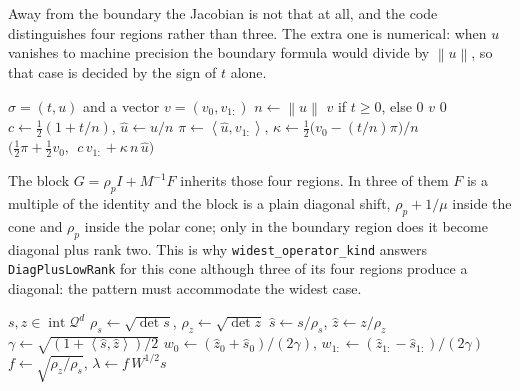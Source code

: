 \documentclass[a4paper,11pt]{book}
\theoremstyle{plain}
\theoremstyle{definition}
\theoremstyle{remark}
\numberwithin{equation}{chapter}
\numberwithin{algorithm}{chapter}
\newcommand{\proj}[2]{\Pi_{#2}\!\left(#1\right)}
\newcommand{\norm}[1]{\left\|#1\right\|}
\newcommand{\inner}[2]{\left\langle #1, #2 \right\rangle}
\newcommand{\intr}{\operatorname{int}}
\begin{document}
	Away from the boundary the Jacobian is not that at all, and the code
	distinguishes four regions rather than three. The extra one is numerical: when
	$u$ vanishes to machine precision the boundary formula would divide by
	$\norm{u}$, so that case is decided by the sign of $t$ alone.

	\begin{algorithm}[H]
		\caption{Applying $F\in\partial\proj{\cdot}{\mathcal{Q}^d}(\sigma)$}
		\begin{algorithmic}[1]
			\Require $\sigma=(t,u)$ and a vector $v=(v_0,v_{1:})$
			\State $n\gets\norm{u}$
			\State \Return $v$ if $t\geq0$, else $0$
			 \State \Return $v$ 
			 \State \Return $0$ 
			\Else
			\State $c\gets\tfrac12(1+t/n)$, \quad $\widehat u\gets u/n$
			\State $\pi\gets\inner{\widehat u}{v_{1:}}$, \quad
			$\kappa\gets\tfrac12\bigl(v_0-(t/n)\pi\bigr)/n$
			\State \Return
			$\bigl(\tfrac12\pi+\tfrac12v_0,\ \ c\,v_{1:}+\kappa\,n\,\widehat
			u\bigr)$
			\EndIf
		\end{algorithmic}
	\end{algorithm}

	The block $G=\rho_pI+M^{-1}F$ inherits those four regions. In three of them
	$F$ is a multiple of the identity and the block is a plain diagonal shift,
	$\rho_p+1/\mu$ inside the cone and $\rho_p$ inside the polar cone; only in the
	boundary region does it become diagonal plus rank two. This is why
	\texttt{widest\_operator\_kind} answers \texttt{DiagPlusLowRank} for this cone
	although three of its four regions produce a diagonal: the pattern must
	accommodate the widest case.

	\begin{algorithm}[H]
		\caption{Nesterov and Todd scaling for the second order cone}
		\begin{algorithmic}[1]
			\Require $s,z\in\intr\mathcal{Q}^d$
			\State $\rho_s\gets\sqrt{\det s}$, \quad $\rho_z\gets\sqrt{\det z}$
			\State $\widehat s\gets s/\rho_s$, \quad $\widehat z\gets z/\rho_z$
			\State $\gamma\gets\sqrt{(1+\inner{\widehat s}{\widehat z})/2}$
			\State $w_0\gets(\widehat z_0+\widehat s_0)/(2\gamma)$, \quad
			$w_{1:}\gets(\widehat z_{1:}-\widehat s_{1:})/(2\gamma)$
			\State $f\gets\sqrt{\rho_z/\rho_s}$, \quad $\lambda\gets f\,W^{1/2}s$
		\end{algorithmic}
	\end{algorithm}
\end{document}

